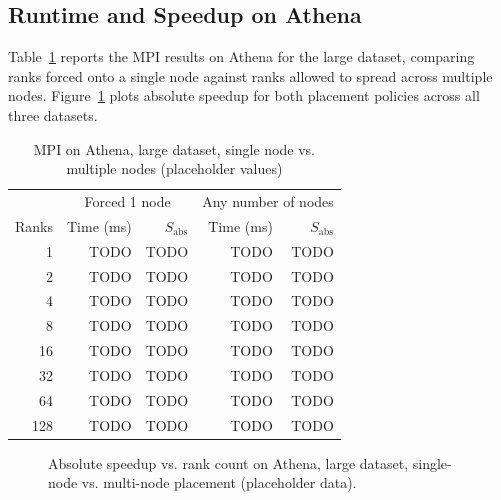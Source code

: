 \documentclass[conference]{IEEEtran}
\begin{document}
\subsection{Runtime and Speedup on Athena}

Table~\ref{tab:athena-mpi} reports the MPI results on Athena for the large
dataset, comparing ranks forced onto a single node against ranks allowed to
spread across multiple nodes. Figure~\ref{fig:athena-mpi} plots absolute
speedup for both placement policies across all three datasets.

\begin{table}[htbp]
\caption{MPI on Athena, large dataset, single node vs. multiple nodes (placeholder values)}
\label{tab:athena-mpi}
\centering
\begin{tabular}{rrrrr}
\toprule
 & \multicolumn{2}{c}{Forced 1 node} & \multicolumn{2}{c}{Any number of nodes} \\
Ranks & Time (ms) & $S_{\text{abs}}$ & Time (ms) & $S_{\text{abs}}$ \\
\midrule
1   & TODO & TODO & TODO & TODO \\
2   & TODO & TODO & TODO & TODO \\
4   & TODO & TODO & TODO & TODO \\
8   & TODO & TODO & TODO & TODO \\
16  & TODO & TODO & TODO & TODO \\
32  & TODO & TODO & TODO & TODO \\
64  & TODO & TODO & TODO & TODO \\
128 & TODO & TODO & TODO & TODO \\
\bottomrule
\end{tabular}
\end{table}

\begin{figure}[htbp]
\centering
{}
\caption{Absolute speedup vs. rank count on Athena, large dataset,
single-node vs. multi-node placement (placeholder data).}
\label{fig:athena-mpi}
\end{figure}
\end{document}
